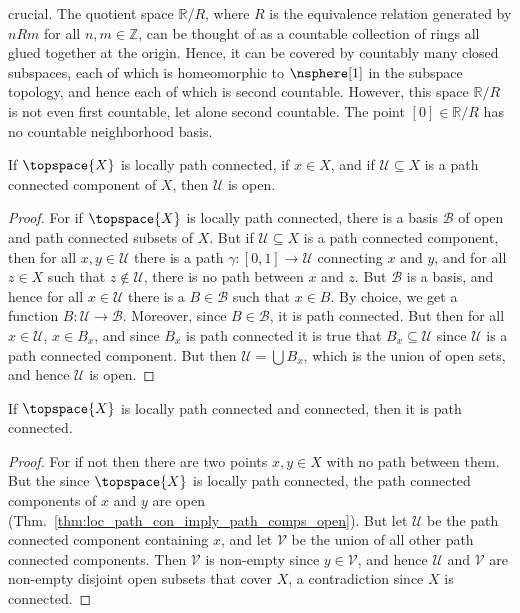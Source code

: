 \documentclass{article}                                                        %
\begin{document}
        crucial. The quotient space $\mathbb{R}/R$, where $R$ is the equivalence
        relation generated by $nRm$ for all $n,m\in\mathbb{Z}$, can be thought
        of as a countable collection of rings all glued together at the origin.
        Hence, it can be covered by countably many closed subspaces, each of
        which is homeomorphic to $\nsphere[1]$ in the subspace topology, and
        hence each of which is second countable. However, this space
        $\mathbb{R}/R$ is not even first countable, let alone second countable.
        The point $[0]\in\mathbb{R}/R$ has no countable neighborhood basis.
        \begin{theorem}
            \label{thm:loc_path_con_imply_path_comps_open}%
            If $\topspace{X}$ is locally path connected, if $x\in{X}$, and if
            $\mathcal{U}\subseteq{X}$ is a path connected component of $X$,
            then $\mathcal{U}$ is open.
        \end{theorem}
        \begin{proof}
            For if $\topspace{X}$ is locally path connected, there is a basis
            $\mathcal{B}$ of open and path connected subsets of $X$. But if
            $\mathcal{U}\subseteq{X}$ is a path connected component, then for
            all $x,y\in\mathcal{U}$ there is a path
            $\gamma:[0,1]\rightarrow\mathcal{U}$ connecting $x$ and $y$, and for
            all $z\in{X}$ such that $z\notin\mathcal{U}$, there is no path
            between $x$ and $z$. But $\mathcal{B}$ is a basis, and hence for
            all $x\in\mathcal{U}$ there is a $B\in\mathcal{B}$ such that
            $x\in{B}$. By choice, we get a function
            $B:\mathcal{U}\rightarrow\mathcal{B}$. Moreover, since
            $B\in\mathcal{B}$, it is path connected. But then for all
            $x\in\mathcal{U}$, $x\in{B}_{x}$, and since $B_{x}$ is path
            connected it is true that $B_{x}\subseteq\mathcal{U}$ since
            $\mathcal{U}$ is a path connected component. But then
            $\mathcal{U}=\bigcup{B}_{x}$, which is the union of open sets, and
            hence $\mathcal{U}$ is open.
        \end{proof}
        \begin{theorem}
            \label{thm:Loc_Path_and_Con_Imply_Path_Con}
            If $\topspace{X}$ is locally path connected and connected, then it
            is path connected.
        \end{theorem}
        \begin{proof}
            For if not then there are two points $x,y\in{X}$ with no path
            between them. But the since $\topspace{X}$ is locally path
            connected, the path connected components of $x$ and $y$ are open
            (Thm.~\ref{thm:loc_path_con_imply_path_comps_open}). But let
            $\mathcal{U}$ be the path connected component containing $x$, and
            let $\mathcal{V}$ be the union of all other path connected
            components. Then $\mathcal{V}$ is non-empty since $y\in\mathcal{V}$,
            and hence $\mathcal{U}$ and $\mathcal{V}$ are non-empty disjoint
            open subsets that cover $X$, a contradiction since $X$ is connected.
        \end{proof}
\end{document}
